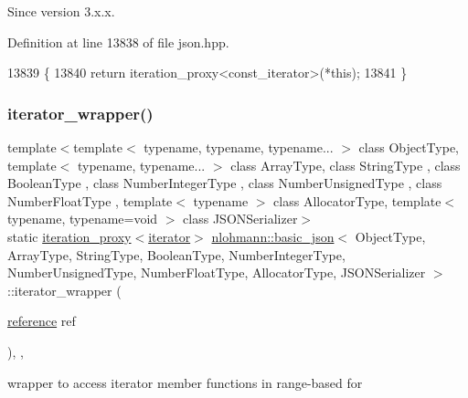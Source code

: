 \begin{DoxySince}{Since}
version 3.\+x.\+x. 
\end{DoxySince}


Definition at line 13838 of file json.\+hpp.


\begin{DoxyCode}
13839     \{
13840         \textcolor{keywordflow}{return} iteration\_proxy<const\_iterator>(*this);
13841     \}
\end{DoxyCode}
\mbox{\label{classnlohmann_1_1basic__json_a5e4212986136ca1220f351c60e89906b}} 
\subsubsection{\texorpdfstring{iterator\+\_\+wrapper()}{iterator\_wrapper()}\hspace{0.1cm}{\footnotesize\ttfamily [1/2]}}
{\footnotesize\ttfamily template$<$template$<$ typename, typename, typename... $>$ class Object\+Type, template$<$ typename, typename... $>$ class Array\+Type, class String\+Type , class Boolean\+Type , class Number\+Integer\+Type , class Number\+Unsigned\+Type , class Number\+Float\+Type , template$<$ typename $>$ class Allocator\+Type, template$<$ typename, typename=void $>$ class J\+S\+O\+N\+Serializer$>$ \\
static \hyperlink{classnlohmann_1_1basic__json_afb49d897bc58d6678f4471925bbfbb01}{iteration\+\_\+proxy}$<$\hyperlink{classnlohmann_1_1basic__json_a099316232c76c034030a38faa6e34dca}{iterator}$>$ \hyperlink{classnlohmann_1_1basic__json}{nlohmann\+::basic\+\_\+json}$<$ Object\+Type, Array\+Type, String\+Type, Boolean\+Type, Number\+Integer\+Type, Number\+Unsigned\+Type, Number\+Float\+Type, Allocator\+Type, J\+S\+O\+N\+Serializer $>$\+::iterator\+\_\+wrapper (\begin{DoxyParamCaption}\item[{\hyperlink{classnlohmann_1_1basic__json_ac6a5eddd156c776ac75ff54cfe54a5bc}{reference}}]{ref }\end{DoxyParamCaption})\hspace{0.3cm}{\ttfamily [inline]}, {\ttfamily [static]}, {\ttfamily [noexcept]}}



wrapper to access iterator member functions in range-\/based for 

